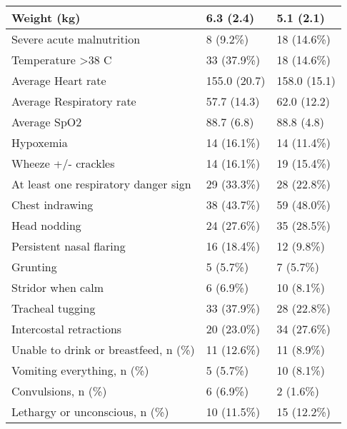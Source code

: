 \documentclass[
]{article}
\begin{document}
\begin{table}[H]
\begin{tabular}[t]{l|l|l}
\hline
Weight (kg) & 6.3 (2.4) & 5.1 (2.1)\\
\hline
Severe acute malnutrition & 8  (9.2\%) & 18 (14.6\%)\\
\hline
Temperature >38 C & 33 (37.9\%) & 18 (14.6\%)\\
\hline
Average Heart rate & 155.0 (20.7) & 158.0 (15.1)\\
\hline
Average Respiratory rate & 57.7 (14.3) & 62.0 (12.2)\\
\hline
Average SpO2 & 88.7 (6.8) & 88.8 (4.8)\\
\hline
Hypoxemia & 14 (16.1\%) & 14 (11.4\%)\\
\hline
Wheeze +/- crackles & 14 (16.1\%) & 19 (15.4\%)\\
\hline
At least one respiratory danger sign & 29 (33.3\%) & 28 (22.8\%)\\
\hline
Chest indrawing & 38 (43.7\%) & 59 (48.0\%)\\
\hline
Head nodding & 24 (27.6\%) & 35 (28.5\%)\\
\hline
Persistent nasal flaring & 16 (18.4\%) & 12  (9.8\%)\\
\hline
Grunting & 5  (5.7\%) & 7  (5.7\%)\\
\hline
Stridor when calm & 6  (6.9\%) & 10  (8.1\%)\\
\hline
Tracheal tugging & 33 (37.9\%) & 28 (22.8\%)\\
\hline
Intercostal retractions & 20 (23.0\%) & 34 (27.6\%)\\
\hline
Unable to drink or breastfeed, n (\%) & 11 (12.6\%) & 11  (8.9\%)\\
\hline
Vomiting everything, n (\%) & 5  (5.7\%) & 10  (8.1\%)\\
\hline
Convulsions, n (\%) & 6  (6.9\%) & 2  (1.6\%)\\
\hline
Lethargy or unconscious, n (\%) & 10 (11.5\%) & 15 (12.2\%)\\
\hline
\end{tabular}
\end{table}
\end{document}
